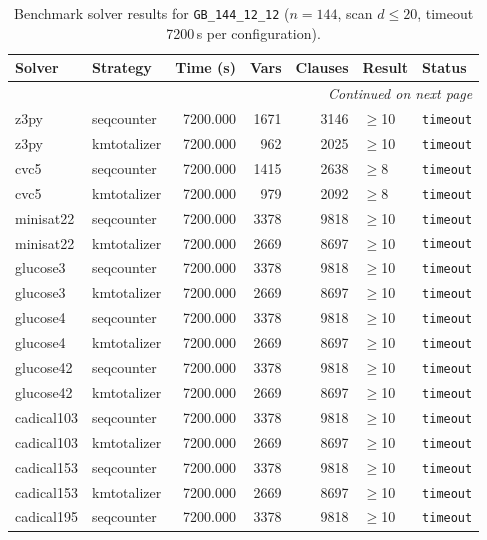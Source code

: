 \begin{longtable}{llrrrl p{}}
\caption{Benchmark solver results for \texttt{GB\_144\_12\_12} ($n=144$, scan $d \leq 20$, timeout 7200\,s per configuration).} \label{tab:bench-GB_144_12_12} \\
\toprule
Solver & Strategy & Time (s) & Vars & Clauses & Result & Status \\
\midrule
\endhead
\midrule
\multicolumn{7}{r}{\textit{Continued on next page}} \\
\midrule
\endfoot
\bottomrule
\endlastfoot
z3py & seqcounter & 7200.000 & 1671 & 3146 & $\geq$10 & \texttt{timeout} \\
z3py & kmtotalizer & 7200.000 & 962 & 2025 & $\geq$10 & \texttt{timeout} \\
cvc5 & seqcounter & 7200.000 & 1415 & 2638 & $\geq$8 & \texttt{timeout} \\
cvc5 & kmtotalizer & 7200.000 & 979 & 2092 & $\geq$8 & \texttt{timeout} \\
minisat22 & seqcounter & 7200.000 & 3378 & 9818 & $\geq$10 & \texttt{timeout} \\
minisat22 & kmtotalizer & 7200.000 & 2669 & 8697 & $\geq$10 & \texttt{timeout} \\
glucose3 & seqcounter & 7200.000 & 3378 & 9818 & $\geq$10 & \texttt{timeout} \\
glucose3 & kmtotalizer & 7200.000 & 2669 & 8697 & $\geq$10 & \texttt{timeout} \\
glucose4 & seqcounter & 7200.000 & 3378 & 9818 & $\geq$10 & \texttt{timeout} \\
glucose4 & kmtotalizer & 7200.000 & 2669 & 8697 & $\geq$10 & \texttt{timeout} \\
glucose42 & seqcounter & 7200.000 & 3378 & 9818 & $\geq$10 & \texttt{timeout} \\
glucose42 & kmtotalizer & 7200.000 & 2669 & 8697 & $\geq$10 & \texttt{timeout} \\
cadical103 & seqcounter & 7200.000 & 3378 & 9818 & $\geq$10 & \texttt{timeout} \\
cadical103 & kmtotalizer & 7200.000 & 2669 & 8697 & $\geq$10 & \texttt{timeout} \\
cadical153 & seqcounter & 7200.000 & 3378 & 9818 & $\geq$10 & \texttt{timeout} \\
cadical153 & kmtotalizer & 7200.000 & 2669 & 8697 & $\geq$10 & \texttt{timeout} \\
cadical195 & seqcounter & 7200.000 & 3378 & 9818 & $\geq$10 & \texttt{timeout} \\

\end{longtable}
